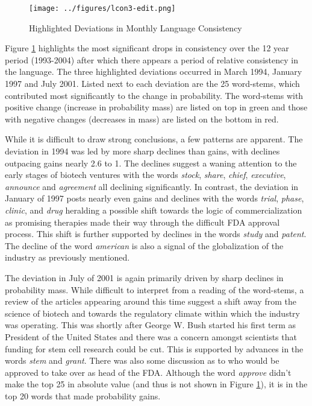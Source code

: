 \begin{landscape}
\begin{figure}
\begin{center}
\texttt{[image: ../figures/lcon3-edit.png]}
\caption[Highlighted Deviations in Monthly Language Consistency]{Highlighted Deviations in Monthly Language Consistency\label{lcon3}}
\end{center}
\end{figure}
\end{landscape}

Figure \ref{lcon3} highlights the most significant drops in consistency over the 12 year period (1993-2004) after which there appears a period of relative consistency in the language. The three highlighted deviations occurred in March 1994, January 1997 and July 2001. Listed next to each deviation are the 25 word-stems, which contributed most significantly to the change in probability. The word-stems with positive change (increase in probability mass) are listed on top in green and those with negative changes (decreases in mass) are listed on the bottom in red. 

While it is difficult to draw strong conclusions, a few patterns are apparent. The deviation in 1994 was led by more  sharp declines than gains, with declines outpacing gains nearly 2.6 to 1. The declines suggest a waning attention to the early stages of biotech ventures with the words \emph{stock}, \emph{share}, \emph{chief}, \emph{executive}, \emph{announce} and \emph{agreement} all declining significantly. In contrast, the deviation in January of 1997 posts nearly even gains and declines with the words \emph{trial}, \emph{phase}, \emph{clinic}, and \emph{drug} heralding a possible shift towards the logic of commercialization as promising therapies made their way through the difficult FDA approval process. This shift is further supported by declines in the words \emph{study} and \emph{patent}. The decline of the word \emph{american} is also a signal of the globalization of the industry as previously mentioned.

The deviation in July of 2001 is again primarily driven by sharp declines in probability mass. While difficult to interpret from a reading of the word-stems, a review of the articles appearing around this time suggest a shift away from the science of biotech and towards the regulatory climate within which the industry was operating. This was shortly after George W. Bush started his first term as President of the United States and there was a concern amongst scientists that funding for stem cell research could be cut. This is supported by advances in the words \emph{stem} and \emph{grant}. There was also some discussion as to who would be approved to take over as head of the FDA. Although the word \emph{approve} didn't make the top 25 in absolute value (and thus is not shown in Figure \ref{lcon3}), it is in the top 20 words that made probability gains.


